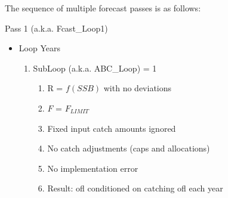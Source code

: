 The sequence of multiple forecast passes is as follows:

Pass 1 (a.k.a. Fcast\_Loop1)
\begin{itemize}
	\item Loop Years
	\begin{enumerate}
		\item SubLoop (a.k.a. ABC\_Loop) = 1
		\begin{enumerate}
			\item R = $f(SSB)$ with no deviations
			\item $F$ = $F_{LIMIT}$
			\item Fixed input catch amounts ignored
			\item No catch adjustments (caps and allocations)
			\item No implementation error
			\item Result: \gls{ofl} conditioned on catching \gls{ofl} each year
		\end{enumerate}
	\end{enumerate}
\end{itemize}

